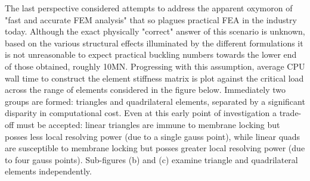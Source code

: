 The last perspective considered attempts to address the apparent oxymoron of "fast and accurate FEM analysis" that so plagues practical FEA in the industry today. Although the exact physically "correct" answer of this scenario is unknown, based on the various structural effects illuminated by the different formulations it is not unreasonable to expect practical buckling numbers towards the lower end of those obtained, roughly 10MN. Progressing with this assumption, average CPU wall time to construct the element stiffness matrix is plot against the critical load across the range of elements considered in the figure below. Immediately two groups are formed: triangles and quadrilateral elements, separated by a significant disparity in computational cost. Even at this early point of investigation a trade-off must be accepted: linear triangles are immune to membrane locking but posses less local resolving power (due to a single gauss point), while linear quads are susceptible to membrane locking but posses greater local resolving power (due to four gauss points). Sub-figures (b) and (c) examine triangle and quadrilateral elements independently.

